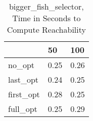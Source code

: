 \begin{table}
\caption{bigger\_fish\_selector, Time in Seconds to Compute Reachability}
\label{bigger_fish_selector_states_time}
\begin{tabular}{lll}
\toprule
 & 50 & 100 \\
\midrule
no\_opt & 0.25 & 0.26 \\
last\_opt & 0.24 & 0.25 \\
first\_opt & 0.28 & 0.25 \\
full\_opt & 0.25 & 0.29 \\
\bottomrule
\end{tabular}
\end{table}
